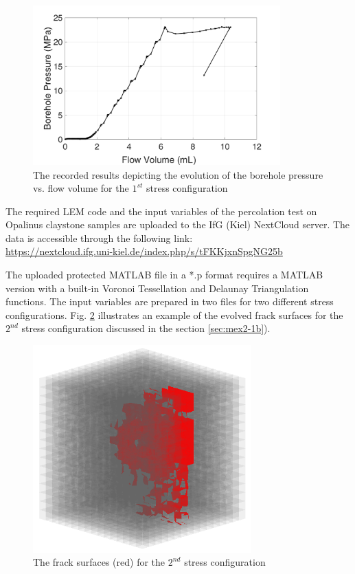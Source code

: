 \begin{figure}[!ht]
\centering
\includegraphics[width=0.85\textwidth]{figures/Amir_Percolation_Flow_a_Data.png}
\caption{The recorded results depicting the evolution of the borehole pressure vs. flow volume for the $1^{st}$ stress configuration}
\label{fig:Amir_Percolation_Flow_a_Data}
\end{figure}

The required LEM code and the input variables of the percolation test on Opalinus claystone samples are uploaded to the IfG (Kiel) NextCloud server. The data is accessible through the following link:\\
\url{https://nextcloud.ifg.uni-kiel.de/index.php/s/tFKKjxnSpgNG25b}

The uploaded protected MATLAB file in a *.p format requires a MATLAB version with a built-in Voronoi Tessellation and Delaunay Triangulation functions. The input variables are prepared in two files for two different stress configurations. Fig. \ref{fig:Amir_ME2_B_Fracture_b_Data}
illustrates an example of the evolved frack surfaces for the $2^{nd}$ stress configuration discussed in the section \ref{sec:mex2-1b}).

\begin{figure}[!ht]
\centering
\includegraphics[width=0.75\textwidth]{figures/Amir_ME2_B_Fracture_b_Data.png}
\caption{The frack surfaces (red) for the $2^{nd}$ stress configuration}
\label{fig:Amir_ME2_B_Fracture_b_Data}
\end{figure}

